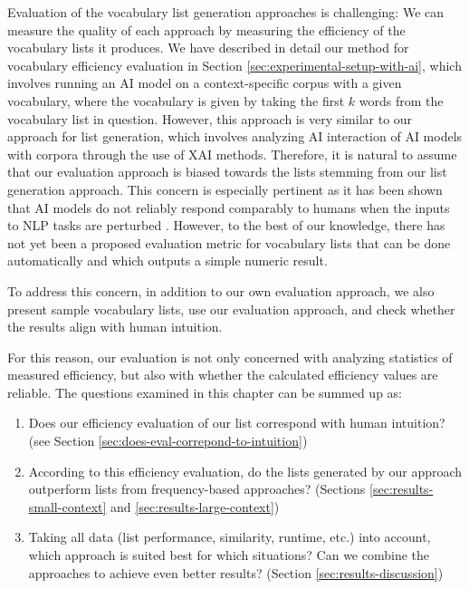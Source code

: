 Evaluation of the vocabulary list generation approaches is challenging:
We can measure the quality of each approach by measuring the efficiency of the vocabulary lists it produces.
We have described in detail our method for vocabulary efficiency evaluation in Section \ref{sec:experimental-setup-with-ai}, which involves running an AI model on a context-specific corpus with a given vocabulary, where the vocabulary is given by taking the first $k$ words from the vocabulary list in question.
However, this approach is very similar to our approach for list generation, which involves analyzing AI interaction of AI models with corpora through the use of XAI methods.
Therefore, it is natural to assume that our evaluation approach is biased towards the lists stemming from our list generation approach.
This concern is especially pertinent as it has been shown that AI models do not reliably respond comparably to humans when the inputs to NLP tasks are perturbed \cite{tjuatjaLLMsExhibitHumanlike2024}.
However, to the best of our knowledge, there has not yet been a proposed evaluation metric for vocabulary lists that can be done automatically and which outputs a simple numeric result.

To address this concern, in addition to our own evaluation approach, we also present sample vocabulary lists, use our evaluation approach, and check whether the results align with human intuition.

For this reason, our evaluation is not only concerned with analyzing statistics of measured efficiency, but also with whether the calculated efficiency values are reliable.
The questions examined in this chapter can be summed up as:
\begin{enumerate}
	\item Does our efficiency evaluation of our list correspond with human intuition? (see Section \ref{sec:does-eval-correpond-to-intuition})
	\item According to this efficiency evaluation, do the lists generated by our approach outperform lists from frequency-based approaches? (Sections \ref{sec:results-small-context} and \ref{sec:results-large-context})
	\item Taking all data (list performance, similarity, runtime, etc.) into account, which approach is suited best for which situations? Can we combine the approaches to achieve even better results? (Section \ref{sec:results-discussion})
\end{enumerate}

